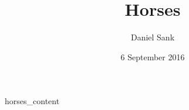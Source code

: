 \documentclass{article}
\title{Horses}
\author{Daniel Sank}
\date{6 September 2016}
\begin{document}
\maketitle
{horses_content}
\end{document}
